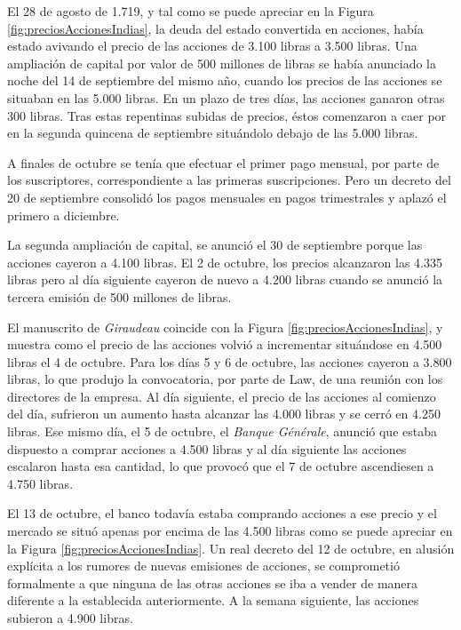 El 28 de agosto de 1.719, y tal como se puede apreciar en la Figura \ref{fig:preciosAccionesIndias}, la deuda del estado convertida en acciones, había estado avivando el precio de las acciones de 3.100 libras a 3.500 libras. Una ampliación de capital por valor de 500 millones de libras se había anunciado la noche del 14 de septiembre del mismo año, cuando los precios de las acciones se situaban en las 5.000 libras. En un plazo de tres días, las acciones ganaron otras 300 libras. Tras estas repentinas subidas de precios, éstos comenzaron a caer por en la segunda quincena de septiembre situándolo debajo de las 5.000 libras. 

A finales de octubre se tenía que efectuar el primer pago mensual, por parte de los suscriptores, correspondiente a las primeras suscripciones. Pero un decreto del 20 de septiembre consolidó los pagos mensuales en pagos trimestrales y aplazó el primero a diciembre.

La segunda ampliación de capital, se anunció el 30 de septiembre porque las acciones cayeron a 4.100 libras. El 2 de octubre, los precios alcanzaron las 4.335 libras pero al día siguiente cayeron de nuevo a 4.200 libras cuando se anunció la tercera emisión de 500 millones de libras.

El manuscrito de \emph{Giraudeau} coincide con la Figura \ref{fig:preciosAccionesIndias}, y muestra como el precio de las acciones volvió a incrementar situándose en 4.500 libras el 4 de octubre. Para los días 5 y 6 de octubre, las acciones cayeron a 3.800 libras, lo que produjo la convocatoria, por parte de Law, de una reunión con los directores de la empresa. Al día siguiente, el precio de las acciones al comienzo del día, sufrieron un aumento hasta alcanzar las 4.000 libras y se cerró en 4.250 libras. Ese mismo día, el 5 de octubre, el \emph{Banque Générale}, anunció que estaba dispuesto a comprar acciones a 4.500 libras y al día siguiente las acciones escalaron hasta esa cantidad, lo que provocó que el 7 de octubre ascendiesen a 4.750 libras.

El 13 de octubre, el banco todavía estaba comprando acciones a ese precio y el mercado se situó apenas por encima de las 4.500 libras como se puede apreciar en la Figura \ref{fig:preciosAccionesIndias}. Un real decreto del 12 de octubre, en alusión explícita a los rumores de nuevas emisiones de acciones, se comprometió formalmente a que ninguna de las otras acciones se iba a vender de manera diferente a la establecida anteriormente. A la semana siguiente, las acciones subieron a 4.900 libras.

